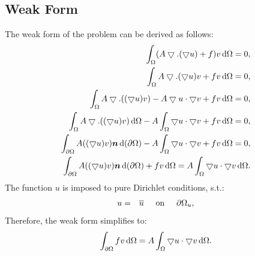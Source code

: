 \documentclass[a4paper,12pt]{article}
\newcommand{\mb}[1]{{\mbox{\boldmath$#1$\unboldmath}}}
\newcommand{\intd}{\,{\rm d}}
\begin{document}
\subsection{Weak Form}
The weak form of the problem can be derived as follows:
\begin{eqnarray}
\int_{\Omega}(A \bigtriangledown.(\bigtriangledown u )  + f) v  \intd \Omega = 0,\\
\int_{\Omega}A \bigtriangledown.(\bigtriangledown u) v + fv \intd \Omega = 0,\\
\int_{\Omega}A \bigtriangledown.((\bigtriangledown u )v) -A \bigtriangledown u\cdot\bigtriangledown v  + fv \intd \Omega = 0,\\
\int_{\Omega}A \bigtriangledown.((\bigtriangledown u) v) \intd\Omega -A\int_{\Omega} \bigtriangledown u\cdot\bigtriangledown v  + fv \intd \Omega = 0,\\
\int_{\partial\Omega}A ((\bigtriangledown u)v) \mb{n}\intd(\partial\Omega) -A\int_{\Omega} \bigtriangledown u\cdot\bigtriangledown v  + fv\intd \Omega = 0,\\
\int_{\partial\Omega}A ((\bigtriangledown u)v) \mb{n}\intd(\partial\Omega) + fv \intd \Omega = A\int_{\Omega} \bigtriangledown u\cdot\bigtriangledown v\intd \Omega.\\
\end{eqnarray}
The function $u$ is imposed to pure Dirichlet conditions, s.t.:
\begin{eqnarray}
 u&=& \overline{u} \hspace{0.5cm}\text{on} \hspace{0.5cm}\partial\Omega_u,\\
\end{eqnarray}
Therefore, the weak form simplifies to:
\begin{equation}
\int_{\partial\Omega} fv \intd \Omega = A\int_{\Omega} \bigtriangledown u\cdot\bigtriangledown v\intd \Omega.
\end{equation}
\end{document}
